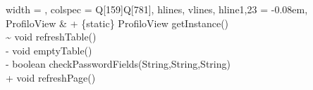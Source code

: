 \begin{longtblr}[
    label = none,
    entry = none,
  ]{
    width = \linewidth,
    colspec = {Q[159]Q[781]},
    hlines,
    vlines,
    hline{1,23} = {-}{0.08em},
  }
  ProfiloView            & {+ \{static\} ProfiloView getInstance()\\\textasciitilde{} void refreshTable()\\- void emptyTable()\\- boolean checkPasswordFields(String,String,String)\\+ void refreshPage()}                                                                                                                                                                                                                                                                                                                                                                                                                                                                                                                                                                                                                                                                                                                                                                                                                                                                                                                                                                                                                                                                                                                                                                                                                                                                                                                                                                                                                                                                                                                                                                                                                                                                                                                 \\

\end{longtblr}

